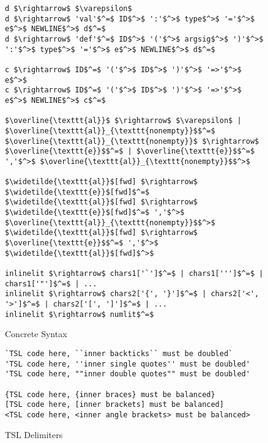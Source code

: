 \begin{figure}
\begin{lstlisting}[mathescape]
d $\rightarrow$ $\varepsilon$
d $\rightarrow$ 'val'$^=$ ID$^>$ ':'$^>$ type$^>$ '='$^>$ e$^>$ NEWLINE$^>$ d$^=$
d $\rightarrow$ 'def'$^=$ ID$^>$ '('$^>$ argsig$^>$ ')'$^>$ ':'$^>$ type$^>$ '='$^>$ e$^>$ NEWLINE$^>$ d$^=$

c $\rightarrow$ ID$^=$ '('$^>$ ID$^>$ ')'$^>$ '=>'$^>$ e$^>$
c $\rightarrow$ ID$^=$ '('$^>$ ID$^>$ ')'$^>$ '=>'$^>$ e$^>$ NEWLINE$^>$ c$^=$

$\overline{\texttt{al}}$ $\rightarrow$ $\varepsilon$ | $\overline{\texttt{al}}_{\texttt{nonempty}}$$^=$
$\overline{\texttt{al}}_{\texttt{nonempty}}$ $\rightarrow$ $\overline{\texttt{e}}$$^=$ | $\overline{\texttt{e}}$$^=$ ','$^>$ $\overline{\texttt{al}}_{\texttt{nonempty}}$$^>$

$\widetilde{\texttt{al}}$[fwd] $\rightarrow$ $\widetilde{\texttt{e}}$[fwd]$^=$
$\widetilde{\texttt{al}}$[fwd] $\rightarrow$ $\widetilde{\texttt{e}}$[fwd]$^=$ ','$^>$ $\overline{\texttt{al}}_{\texttt{nonempty}}$$^>$
$\widetilde{\texttt{al}}$[fwd] $\rightarrow$ $\overline{\texttt{e}}$$^=$ ','$^>$ $\widetilde{\texttt{al}}$[fwd]$^>$

inlinelit $\rightarrow$ chars1['`']$^=$ | chars1[''']$^=$ | chars1['"']$^=$ | ...
inlinelit $\rightarrow$ chars2['{', '}']$^=$ | chars2['<', '>']$^=$ | chars2['[', ']']$^=$ | ...
inlinelit $\rightarrow$ numlit$^=$
\end{lstlisting}
\caption{Concrete Syntax}
\label{f-grammar}
\end{figure}

\begin{figure}
\begin{lstlisting}[mathescape]
`TSL code here, ``inner backticks`` must be doubled`
'TSL code here, ''inner single quotes'' must be doubled'
'TSL code here, ""inner double quotes"" must be doubled'

{TSL code here, {inner braces} must be balanced}
[TSL code here, [inner brackets] must be balanced]
<TSL code here, <inner angle brackets> must be balanced>
\end{lstlisting}
\caption{TSL Delimiters}
\label{f-delims}
\end{figure}
